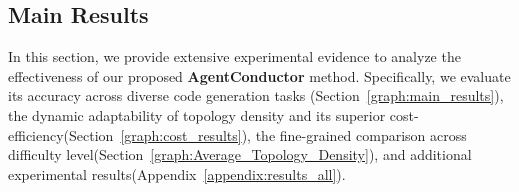 \documentclass{article}
\theoremstyle{definition}
\begin{document}
\subsection{Main Results}
In this section, we provide extensive experimental evidence to analyze the effectiveness of our proposed \textbf{AgentConductor} method. Specifically, we evaluate its accuracy across diverse code generation tasks (Section~\ref{graph:main_results}), the dynamic adaptability of topology density and its superior cost-efficiency(Section~\ref{graph:cost_results}), the fine-grained comparison across difficulty level(Section~\ref{graph:Average_Topology_Density}), and additional experimental results(Appendix~\ref{appendix:results_all}).
\vspace{-1.15em}
\end{document}
